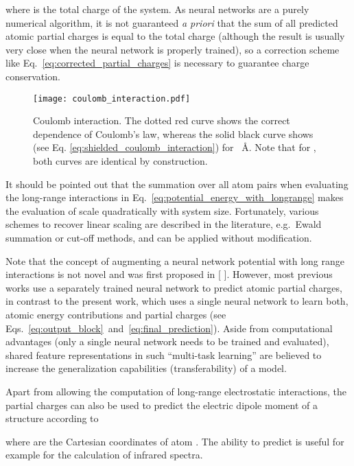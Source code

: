 \documentclass[12pt]{article}
\makeatletter
\DeclareRobustCommand\citenum
{\begingroup
	\NAT@swatrue\let\NAT@ctype\z@\NAT@parfalse\let\textsuperscript\relax \NAT@citexnum[][]}
\makeatother
\begin{document}
where  is the total charge of the system. As neural networks are a
purely numerical algorithm, it is not guaranteed \textit{a priori}
that the sum of all predicted atomic partial charges  is equal to
the total charge  (although the result is usually very close when
the neural network is properly trained), so a correction scheme like
Eq.~\ref{eq:corrected_partial_charges} is necessary to guarantee
charge conservation.

\begin{figure}[htpb]
\centering
\texttt{[image: coulomb\_interaction.pdf]}
\caption{Coulomb interaction. The dotted red curve shows the correct
   dependence of Coulomb's law, whereas the solid black
  curve shows  (see
  Eq. \ref{eq:shielded_coulomb_interaction}) for \ \AA. Note that for , both curves are
  identical by construction.}
\label{fig:coulomb_interaction}
\end{figure}

It should be pointed out that the summation over all atom pairs when
evaluating the long-range interactions in
Eq.~\ref{eq:potential_energy_with_longrange} makes the evaluation of
 scale quadratically with system size. Fortunately, various schemes
to recover linear scaling are described in the literature, e.g.\ Ewald
summation\cite{darden1993particle} or cut-off
methods\cite{steinbach1994new}, and can be applied without
modification.

Note that the concept of augmenting a neural network potential with
long range interactions is not novel and was first proposed in
[\citenum{artrith2011high}]. However, most previous works use a
separately trained neural network to predict atomic partial
charges,\cite{artrith2011high,yao2018tensormol} in contrast to the
present work, which uses a single neural network to learn both, atomic
energy contributions and partial charges (see
Eqs.~\ref{eq:output_block}~and~\ref{eq:final_prediction}). Aside from
computational advantages (only a single neural network needs to be
trained and evaluated), shared feature representations in such
``multi-task learning'' are believed to increase the generalization
capabilities (transferability) of a
model.\cite{thrun1996learning,caruana1997multitask,baxter2000model}

Apart from allowing the computation of long-range electrostatic
interactions, the partial charges  can also be used to
predict the electric dipole moment  of a structure
according to

where  are the Cartesian coordinates of atom . The
ability to predict  is useful for example for the
calculation of infrared
spectra.\cite{gastegger2017machine,nebgen2018transferable}
\end{document}

